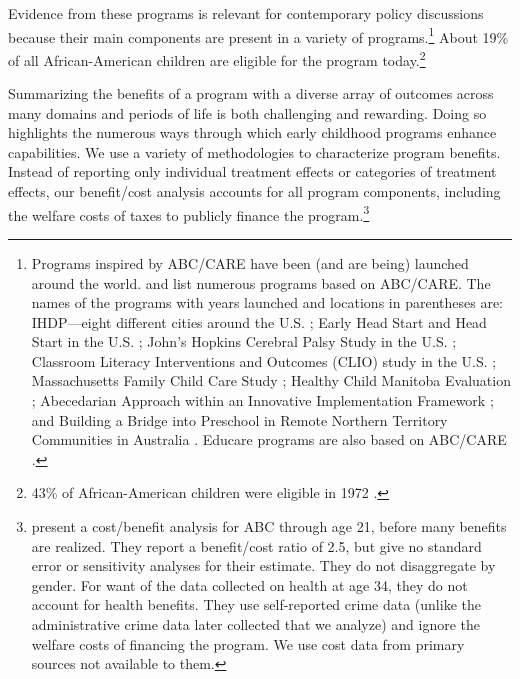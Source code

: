 Evidence from these programs is relevant for contemporary policy discussions because their main components are present in a variety of programs.\footnote{Programs inspired by ABC/CARE have been (and are being) launched around the world. \citet{Sparling_2010_Highlights} and \citet{Ramey_Ramey_Lanzi_2014_Interventions} list numerous programs based on ABC/CARE. The names of the programs with years launched and locations in parentheses are: IHDP---eight different cities around the U.S. \citep{Spiker-etal_1997_Helping}; Early Head Start and Head Start in the U.S. \citep{Schneider_McDonald-eds_2007_Scale-Up_Vol-1}; John's Hopkins Cerebral Palsy Study in the U.S. \citep{Sparling_2010_Highlights}; Classroom Literacy Interventions and Outcomes (CLIO) study in the U.S. \citep{Sparling_2010_Highlights}; Massachusetts Family Child Care Study \citep{Collins_etal_2010_Massachusetts-Study}; Healthy Child Manitoba Evaluation \citep{Healthy_Child_Manitoba_2015_Starting-Early}; Abecedarian Approach within an Innovative Implementation Framework \citep{Jensen_Nielsen_2016_ABC-Programme-Pilot}; and Building a Bridge into Preschool in Remote Northern Territory Communities in Australia \citep{UMonash_Dataset_2015_URL}. Educare programs are also based on ABC/CARE \citep{Educare_2014_Research_Agenda,Yazejian_Bryant_2012_Educare}.} About 19\% of all African-American children are eligible for the program today.\footnote{43\% of African-American children were eligible in 1972 \citep{Garcia_2016_National-Implementation-ECI}.}

Summarizing the benefits of a program with a diverse array of outcomes across many domains and periods of life is both challenging and rewarding. Doing so highlights the numerous ways through which early childhood programs enhance capabilities. We use a variety of methodologies to characterize program benefits. Instead of reporting only individual treatment effects or categories of treatment effects, our benefit/cost analysis accounts for all program components, including the welfare costs of taxes to publicly finance the program.\footnote{\cite{Barnett_Masse_2002_benefitcost,Barnett_Masse_2007_EER} present a cost/benefit analysis for ABC through age 21, before many benefits are realized. They report a benefit/cost ratio of 2.5, but give no standard error or sensitivity analyses for their estimate. They do not disaggregate by gender. For want of the data collected on health at age 34, they do not account for health benefits. They use self-reported crime data (unlike the administrative crime data later collected that we analyze) and ignore the welfare costs of financing the program. We use cost data from primary sources not available to them.}

